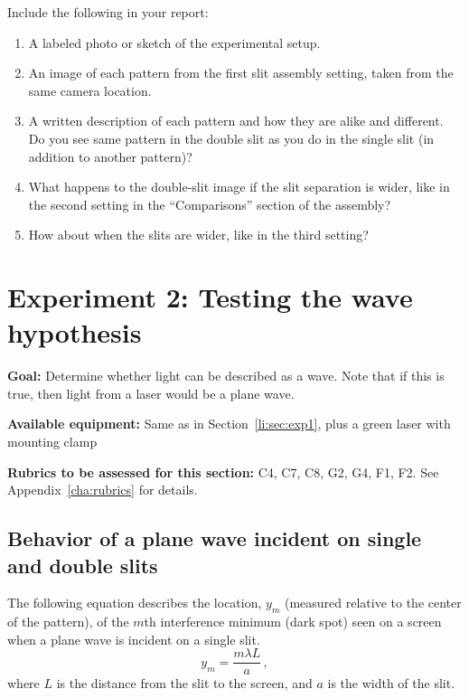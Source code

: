 Include the following in your report:
\begin{enumerate}
	\item A labeled photo or sketch of the experimental setup.
	
	\item An image of each pattern from the first slit assembly setting, taken from the same camera location.
	
	\item A written description of each pattern and how they are alike and different. Do you see same pattern in the double slit as you do in the single slit (in addition to another pattern)?
	
	\item What happens to the double-slit image if the slit separation is wider, like in the second setting in the ``Comparisons'' section of the assembly?
	
	\item How about when the slits are wider, like in the third setting? 
\end{enumerate}

\section{Experiment 2: Testing the wave hypothesis}

\textbf{Goal:} Determine whether light can be described as a wave. Note that if this is true, then light from a laser would be a plane wave.



\textbf{Available equipment:} Same as in Section~\ref{li:sec:exp1}, plus a green laser with mounting clamp

\textbf{Rubrics to be assessed for this section:} C4, C7, C8, G2, G4, F1, F2. See Appendix~\ref{cha:rubrics} for details.

\subsection{Behavior of a plane wave incident on single and double slits}

The following equation describes the location, $y_m$ (measured relative to the center of the pattern), of the $m$th interference minimum (dark spot) seen on a screen when a plane wave is incident on a single slit.
\begin{equation}
y_m = \frac{m \lambda L}{a} \,,
\end{equation}
where $L$ is the distance from the slit to the screen, and $a$ is the width of the slit.

